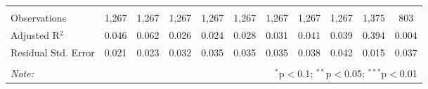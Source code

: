 \begin{table}[!htbp]
\begin{adjustbox}{width=1.35\textwidth}
\begin{tabular}{@{\extracolsep{5pt}}lcccccccccc}
\hline \\[-1.8ex] 
Observations & 1,267 & 1,267 & 1,267 & 1,267 & 1,267 & 1,267 & 1,267 & 1,267 & 1,375 & 803 \\ 
Adjusted R$^{2}$ & 0.046 & 0.062 & 0.026 & 0.024 & 0.028 & 0.031 & 0.041 & 0.039 & 0.394 & 0.004 \\ 
Residual Std. Error & 0.021 & 0.023 & 0.032 & 0.035 & 0.035 & 0.035 & 0.038 & 0.042 & 0.015 & 0.037 \\ 
\hline 
\hline \\[-1.8ex] 
\textit{Note:}  & \multicolumn{10}{r}{$^{*}$p$<$0.1; $^{**}$p$<$0.05; $^{***}$p$<$0.01} \\ 
\end{tabular} 
\end{adjustbox}
\end{table} 
